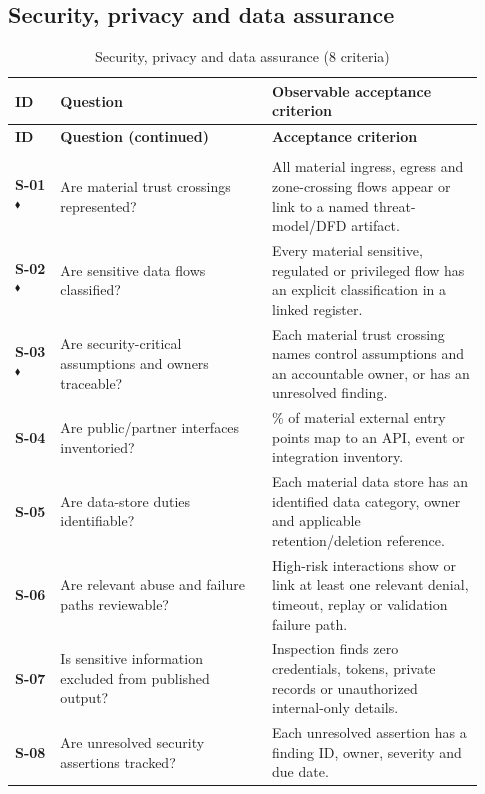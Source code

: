 \documentclass[10pt,letterpaper]{article}
\newcommand{\Gate}{\textsuperscript{\(\blacklozenge\)}}
\newcommand{\CheckRow}[3]{\textbf{\textsf{#1}} & #2 & #3\\[3pt]}
\newcommand{\ChecklistHeader}{\toprule
\textbf{ID} & \textbf{Question} & \textbf{Observable acceptance criterion}\\\midrule
\endfirsthead
\toprule\textbf{ID} & \textbf{Question (continued)} & \textbf{Acceptance criterion}\\\midrule
\endhead
\midrule\multicolumn{3}{r}{\footnotesize Continued on next page}\\\endfoot
\bottomrule\endlastfoot}
\begin{document}
\subsection{Security, privacy and data assurance}
\begin{longtable}{@{}>{\raggedright\arraybackslash}p{0.09\linewidth}>{\raggedright\arraybackslash}p{0.42\linewidth}>{\raggedright\arraybackslash}p{0.42\linewidth}@{}}
\caption{Security, privacy and data assurance (8 criteria)}\label{tab:review-S}\\
\ChecklistHeader
\CheckRow{S-01\Gate}{Are material trust crossings represented?}{All material ingress, egress and zone-crossing flows appear or link to a named threat-model/DFD artifact.}
\CheckRow{S-02\Gate}{Are sensitive data flows classified?}{Every material sensitive, regulated or privileged flow has an explicit classification in a linked register.}
\CheckRow{S-03\Gate}{Are security-critical assumptions and owners traceable?}{Each material trust crossing names control assumptions and an accountable owner, or has an unresolved finding.}
\CheckRow{S-04}{Are public/partner interfaces inventoried?}{100\% of material external entry points map to an API, event or integration inventory.}
\CheckRow{S-05}{Are data-store duties identifiable?}{Each material data store has an identified data category, owner and applicable retention/deletion reference.}
\CheckRow{S-06}{Are relevant abuse and failure paths reviewable?}{High-risk interactions show or link at least one relevant denial, timeout, replay or validation failure path.}
\CheckRow{S-07}{Is sensitive information excluded from published output?}{Inspection finds zero credentials, tokens, private records or unauthorized internal-only details.}
\CheckRow{S-08}{Are unresolved security assertions tracked?}{Each unresolved assertion has a finding ID, owner, severity and due date.}
\end{longtable}
\end{document}
